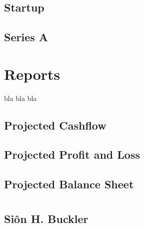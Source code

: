 \documentclass[letterpaper,10pt,openany,oneside,english]{sphinxmanual}
\begin{document}
\section{Startup}
\label{\detokenize{startup-funding:startup}}

\section{Series A}
\label{\detokenize{startup-funding:series-a}}

\chapter{Reports}
\label{\detokenize{reports:reports}}\label{\detokenize{reports::doc}}
bla bla bla


\section{Projected Cashflow}
\label{\detokenize{reports:projected-cashflow}}

\section{Projected Profit and Loss}
\label{\detokenize{reports:projected-profit-and-loss}}

\section{Projected Balance Sheet}
\label{\detokenize{reports:projected-balance-sheet}}

\chapter{}
\label{\detokenize{index:document-author-s}}

\section{Siôn H. Buckler}
\label{\detokenize{index:sion-h-buckler}}
\end{document}
